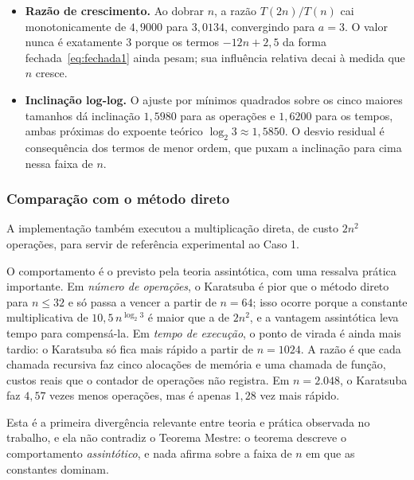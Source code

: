 \documentclass[11pt,a4paper]{article}
\begin{document}
\begin{itemize}[itemsep=1pt]
  \item \textbf{Razão de crescimento.} Ao dobrar $n$, a razão $T(2n)/T(n)$ cai monotonicamente de $4{,}9000$ para $3{,}0134$, convergindo para $a=3$. O valor nunca é exatamente 3 porque os termos $-12n+2{,}5$ da forma fechada~\eqref{eq:fechada1} ainda pesam; sua influência relativa decai à medida que $n$ cresce.
  \item \textbf{Inclinação log-log.} O ajuste por mínimos quadrados sobre os cinco maiores tamanhos dá inclinação $1{,}5980$ para as operações e $1{,}6200$ para os tempos, ambas próximas do expoente teórico $\log_2 3\approx1{,}5850$. O desvio residual é consequência dos termos de menor ordem, que puxam a inclinação para cima nessa faixa de $n$.
\end{itemize}

\subsubsection{Comparação com o método direto}

A implementação também executou a multiplicação direta, de custo $2n^2$ operações, para servir de referência experimental ao Caso 1.

\begin{table}[H]
\centering
\caption{Problema 1: Karatsuba comparado à multiplicação direta.}
\label{tab:p1comp}
\small

\end{table}

O comportamento é o previsto pela teoria assintótica, com uma ressalva prática importante. Em \emph{número de operações}, o Karatsuba é pior que o método direto para $n\le32$ e só passa a vencer a partir de $n=64$; isso ocorre porque a constante multiplicativa de $10{,}5\,n^{\log_2 3}$ é maior que a de $2n^2$, e a vantagem assintótica leva tempo para compensá-la. Em \emph{tempo de execução}, o ponto de virada é ainda mais tardio: o Karatsuba só fica mais rápido a partir de $n=1024$. A razão é que cada chamada recursiva faz cinco alocações de memória e uma chamada de função, custos reais que o contador de operações não registra. Em $n=2.048$, o Karatsuba faz $4{,}57$ vezes menos operações, mas é apenas $1{,}28$ vez mais rápido.

Esta é a primeira divergência relevante entre teoria e prática observada no trabalho, e ela não contradiz o Teorema Mestre: o teorema descreve o comportamento \emph{assintótico}, e nada afirma sobre a faixa de $n$ em que as constantes dominam.
\end{document}
